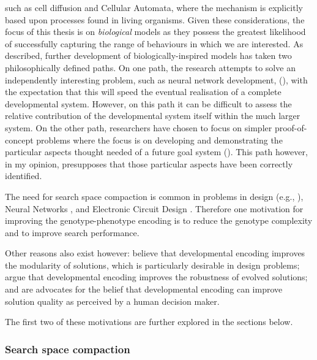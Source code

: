  such as cell diffusion and Cellular Automata, where the mechanism is explicitly based upon processes found in living organisms. Given these considerations, the focus of this thesis is on \emph{biological} models as they possess the greatest likelihood of successfully capturing the range of behaviours in which we are interested. As \textcite{Stanley:2003fh} described, further development of biologically-inspired models has taken two philosophically defined paths. On one path, the research attempts to solve an independently interesting problem, such as neural network development, (\eg \cite{Bongard:2003tf}), with the expectation that this will speed the eventual realisation of a complete developmental system. However, on this path it can be difficult to assess the relative contribution of the developmental system itself within the much larger system. On the other path, researchers have chosen to focus on simpler proof-of-concept problems where the focus is on developing and demonstrating the particular aspects thought needed of a future goal system (\eg \cite{Bentley:1999zr,Roggen:2007kl}). This path however, in my opinion, presupposes that those particular aspects have been correctly identified.

The need for search space compaction is common in problems in design (e.g., \cite{Benedetti:2006bl,Nicolaou:2009hs,Yang:2009ch}), Neural Networks \parencite{Roy:2009jf}, and Electronic Circuit Design \parencite{Roggen:2007kl,Trefzer:2009qf,Tufte:2006bh,Remortel:2002fk}. Therefore one motivation for improving the genotype-phenotype encoding is to reduce the genotype complexity and to improve search performance.  

Other reasons also exist however: \textcite{Dorica:2007wq,Hornby:2003jt,Hornby:2005rw,Hornby:2006kj} believe that developmental encoding improves the modularity of solutions, which is particularly desirable in design problems; \textcite{Devert:2007wl,Federici:2006pb,Miller:2003qy,Roggen:2007kl,Trefzer:2009qf,Yu:1998hx} argue that developmental encoding improves the robustness of evolved solutions; and \textcite{Hornby:2005rw,Hornby:2006kj,Yang:2009li} are advocates for the belief that developmental encoding can improve solution quality as perceived by a human decision maker. 

The first two of these motivations are further explored in the sections below. 

\subsubsection{Search space compaction}

